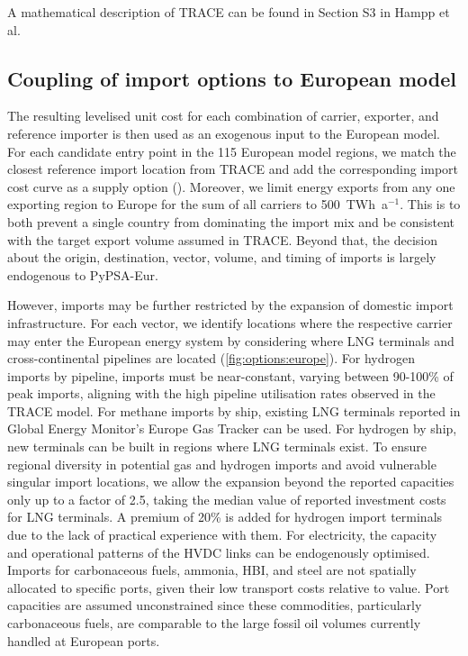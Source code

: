 A mathematical description of TRACE can be found in Section S3 in Hampp et
al.\cite{hamppImportOptions2023}

\subsection*{Coupling of import options to European model}
\label{sec:methods-coupling}

The resulting levelised unit cost for each combination of carrier, exporter, and
reference importer is then used as an exogenous input to the European model. For
each candidate entry point in the 115 European model regions, we match the
closest reference import location from TRACE and add the corresponding import
cost curve as a supply option
().  
Moreover, we limit energy exports from any one exporting region to Europe for
the sum of all carriers to 500~TWh~a$^{-1}$. This is to both prevent a single
country from dominating the import mix and be consistent with the target export
volume assumed in TRACE. Beyond that, the decision about the origin,
destination, vector, volume, and timing of imports is largely endogenous to
PyPSA-Eur.


However, imports may be further restricted by the expansion of domestic import
infrastructure. For each vector, we identify locations where the respective
carrier may enter the European energy system by considering where LNG terminals
and cross-continental pipelines are located (\cref{fig:options:europe}). For
hydrogen imports by pipeline, imports must be near-constant, varying between
90-100\% of peak imports, aligning with the high pipeline utilisation rates
observed in the TRACE model. For methane imports by ship, existing LNG terminals
reported in Global Energy Monitor's Europe Gas
Tracker\cite{globalenergymonitorEuropeGasTracker2024} can be used. For hydrogen
by ship, new terminals can be built in regions where LNG terminals exist. To
ensure regional diversity in potential gas and hydrogen imports and avoid
vulnerable singular import locations, we allow the expansion beyond the reported
capacities only up to a factor of 2.5, taking the median value of reported
investment costs for LNG terminals.\cite{GlobalGas2022} A premium of 20\% is
added for hydrogen import terminals due to the lack of practical experience with
them. For electricity, the capacity and operational patterns of the HVDC links
can be endogenously optimised. Imports for carbonaceous fuels, ammonia, HBI, and
steel are not spatially allocated to specific ports, given their low transport
costs relative to value. Port capacities are assumed unconstrained since these
commodities, particularly carbonaceous fuels, are comparable to the large fossil
oil volumes currently handled at European ports.

